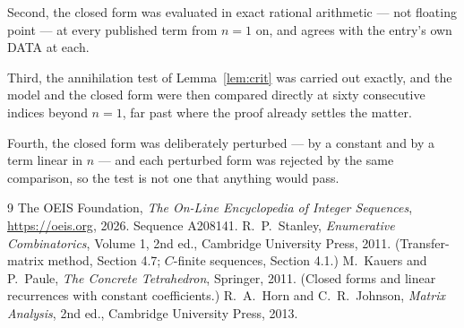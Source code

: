 \documentclass[11pt,a4paper]{article}
\theoremstyle{plain}
\theoremstyle{definition}
\begin{document}
Second, the closed form was evaluated in exact rational arithmetic --- not floating point ---
at every published term from $n=1$ on, and agrees with the entry's own DATA at each.

Third, the annihilation test of Lemma~\ref{lem:crit} was carried out exactly, and the model
and the closed form were then compared directly at sixty consecutive indices beyond
$n=1$, far past where the proof already settles the matter.

Fourth, the closed form was deliberately perturbed --- by a constant and by a term linear in
$n$ --- and each perturbed form was rejected by the same comparison, so the test is not one
that anything would pass.

\begin{thebibliography}{9}
 The OEIS Foundation, \emph{The On-Line Encyclopedia of Integer
Sequences}, \url{https://oeis.org}, 2026. Sequence A208141.
 R.~P.~Stanley, \emph{Enumerative Combinatorics}, Volume 1, 2nd ed.,
Cambridge University Press, 2011. (Transfer-matrix method, Section 4.7; $C$-finite sequences,
Section 4.1.)
 M.~Kauers and P.~Paule, \emph{The Concrete Tetrahedron}, Springer, 2011.
(Closed forms and linear recurrences with constant coefficients.)
 R.~A.~Horn and C.~R.~Johnson, \emph{Matrix Analysis}, 2nd ed., Cambridge
University Press, 2013.
\end{thebibliography}
\end{document}
